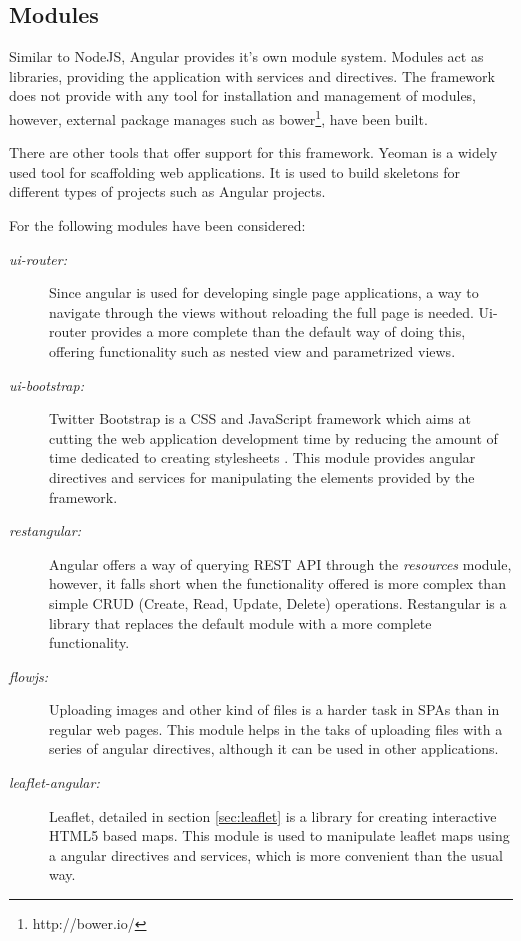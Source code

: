 \subsection*{Modules}

Similar to NodeJS, Angular provides it's own module system. Modules act as libraries, providing the application with services and directives. The framework does not provide with any tool for installation and management of modules, however, external package manages such as bower\footnote{http://bower.io/}, have been built.

There are other tools that offer support for this framework. Yeoman is a widely used tool for scaffolding web applications. It is used to build skeletons for different types of projects such as Angular projects.

For the following modules have been considered:

\begin{description}
\item[\textit{ui-router:}] Since angular is used for developing single page applications, a way to navigate through the views without reloading the full page is needed. Ui-router provides a more complete than the default way of doing this, offering functionality such as nested view and parametrized views.

\item[\textit{ui-bootstrap:}] Twitter Bootstrap is a CSS and JavaScript framework which aims at cutting the web application development time by reducing the amount of time dedicated to creating stylesheets \cite{twbts}. This module provides angular directives and services for manipulating the elements provided by the framework.

\item[\textit{restangular:}] Angular offers a way of querying REST API through the \textit{resources} module, however, it falls short when the functionality offered is more complex than simple CRUD (Create, Read, Update, Delete) operations. Restangular is a library that replaces the default module with a more complete functionality.

\item[\textit{flowjs:}] Uploading images and other kind of files is a harder task in SPAs than in regular web pages. This module helps in the taks of uploading files with a series of angular directives, although it can be used in other applications.

\item[\textit{leaflet-angular:}] Leaflet, detailed in section \ref{sec:leaflet} is a library for creating interactive HTML5 based maps. This module is used to manipulate leaflet maps using a angular directives and services, which is more convenient than the usual way.

\end{description}

